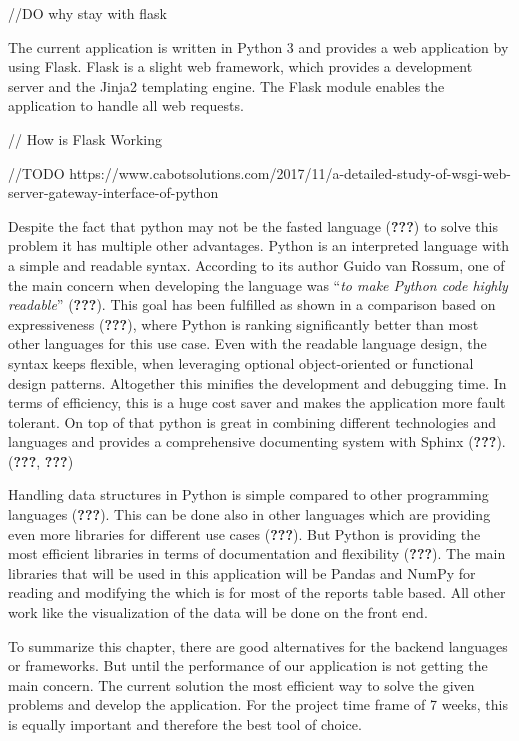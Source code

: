\documentclass[american,a4paper,oneside,,tablecaptionabove]{scrbook}
\begin{document}
//DO why stay with flask

The current application is written in Python 3 and provides a web
application by using Flask. Flask is a slight web framework, which
provides a development server and the Jinja2 templating engine. The
Flask module enables the application to handle all web requests.

// How is Flask Working

//TODO
https://www.cabotsolutions.com/2017/11/a-detailed-study-of-wsgi-web-server-gateway-interface-of-python

Despite the fact that python may not be the fasted language
({\textbf{???}}) to solve this problem it has multiple other advantages.
Python is an interpreted language with a simple and readable syntax.
According to its author Guido van Rossum, one of the main concern when
developing the language was \enquote{\emph{to make Python code highly
readable}} ({\textbf{???}}). This goal has been fulfilled as shown in a
comparison based on expressiveness ({\textbf{???}}), where Python is
ranking significantly better than most other languages for this use
case. Even with the readable language design, the syntax keeps flexible,
when leveraging optional object-oriented or functional design patterns.
Altogether this minifies the development and debugging time. In terms of
efficiency, this is a huge cost saver and makes the application more
fault tolerant. On top of that python is great in combining different
technologies and languages and provides a comprehensive documenting
system with Sphinx ({\textbf{???}}). ({\textbf{???}}, \textbf{???})

Handling data structures in Python is simple compared to other
programming languages ({\textbf{???}}). This can be done also in other
languages which are providing even more libraries for different use
cases ({\textbf{???}}). But Python is providing the most efficient
libraries in terms of documentation and flexibility ({\textbf{???}}).
The main libraries that will be used in this application will be Pandas
and NumPy for reading and modifying the which is for most of the reports
table based. All other work like the visualization of the data will be
done on the front end.

To summarize this chapter, there are good alternatives for the backend
languages or frameworks. But until the performance of our application is
not getting the main concern. The current solution the most efficient
way to solve the given problems and develop the application. For the
project time frame of 7 weeks, this is equally important and therefore
the best tool of choice.
\end{document}
